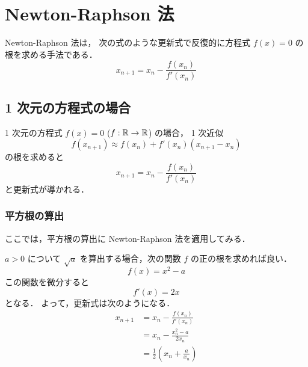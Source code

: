 %

\chapter{Newton-Raphson 法}

Newton-Raphson 法は，
次の式のような更新式で反復的に方程式 $f(x) = 0$ の根を求める手法である．
\begin{equation}
    x_{n+1} = x_n - \frac{f(x_n)}{f'(x_n)}
\end{equation}

\section{1 次元の方程式の場合}

1 次元の方程式 $f(x) = 0$ ($f: \mathbb{R} \to \mathbb{R}$) の場合，
1 次近似
\begin{equation}
    f(x_{n+1}) \approx f(x_n) + f'(x_n) (x_{n+1} - x_n)
\end{equation}
の根を求めると
\begin{equation}
    x_{n+1} = x_n - \frac{f(x_n)}{f'(x_n)}
    \label{eq:root-finding_newton-raphson_one-dim-update-law}
\end{equation}
と更新式が導かれる．

\subsection{平方根の算出}

ここでは，平方根の算出に Newton-Raphson 法を適用してみる．

$a>0$ について $\sqrt{a}$ を算出する場合，次の関数 $f$ の正の根を求めれば良い．
\begin{equation}
    f(x) = x^2 - a
\end{equation}
この関数を微分すると
\begin{equation}
    f'(x) = 2x
\end{equation}
となる．
よって，更新式は次のようになる．
\begin{align}
    x_{n+1} & = x_n - \frac{f(x_n)}{f'(x_n)}                \\
            & = x_n - \frac{x_n^2 - a}{2x_n}                \\
            & = \frac{1}{2}\left(x_n + \frac{a}{x_n}\right)
    \label{eq:root-finding_newton-raphson_sqrt-update-law}
\end{align}

